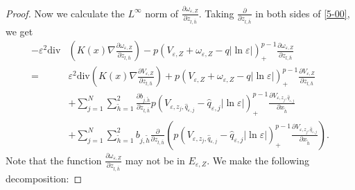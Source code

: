 \documentclass[12pt,reqno]{amsart}
\numberwithin{equation}{section}
\theoremstyle{definition}
\theoremstyle{remark}
\begin{document}
\begin{proof}
Now we calculate the $ L^\infty $ norm of $ \frac{\partial \omega_{\varepsilon,Z} }{\partial z_{l,\bar{h}}} $. Taking $ \frac{\partial}{\partial z_{l,\bar{h}}} $ in both sides of \eqref{5-00}, we get
\begin{equation}\label{5-18}
\begin{split}
-\varepsilon^2\text{div}&\left( K(x)\nabla \frac{\partial\omega_{\varepsilon,Z}}{\partial z_{l,\bar{h}}}\right)-p\left( V_{\varepsilon,Z}+\omega_{\varepsilon,Z}-q|\ln\varepsilon|\right)^{p-1}_+\frac{\partial\omega_{\varepsilon,Z}}{\partial z_{l,\bar{h}}}\\
=&\varepsilon^2\text{div}\left( K(x)\nabla \frac{\partial V_{\varepsilon,Z}}{\partial z_{l,\bar{h}}}\right)+p\left( V_{\varepsilon,Z}+\omega_{\varepsilon,Z}-q|\ln\varepsilon|\right)^{p-1}_+\frac{\partial V_{\varepsilon,Z}}{\partial z_{l,\bar{h}}}\\
&+\sum_{j=1}^N\sum_{\tilde{h}=1}^2\frac{\partial b_{j,\tilde{h}}}{\partial z_{l,\bar{h}}}p\left(   V_{\varepsilon, z_j, \hat{q}_{\varepsilon,j}}-\hat{q}_{\varepsilon,j}|\ln\varepsilon| \right )^{p-1}_+\frac{\partial V_{\varepsilon, z_j, \hat{q}_{\varepsilon,j}}}{\partial x_{\tilde{h}}}\\
&+\sum_{j=1}^N\sum_{\tilde{h}=1}^2b_{j,\tilde{h}}\frac{\partial }{\partial z_{l,\bar{h}}}\left( p\left(   V_{\varepsilon, z_j, \hat{q}_{\varepsilon,j}}-\hat{q}_{\varepsilon,j}|\ln\varepsilon| \right )^{p-1}_+\frac{\partial V_{\varepsilon, z_j, \hat{q}_{\varepsilon,j}}}{\partial x_{\tilde{h}}}\right) .
\end{split}
\end{equation}
Note that the function $ \frac{\partial\omega_{\varepsilon,Z}}{\partial z_{l,\bar{h}}} $ may not be in $ E_{\varepsilon,Z} $. We make the following decomposition:

\end{proof}
\end{document}
